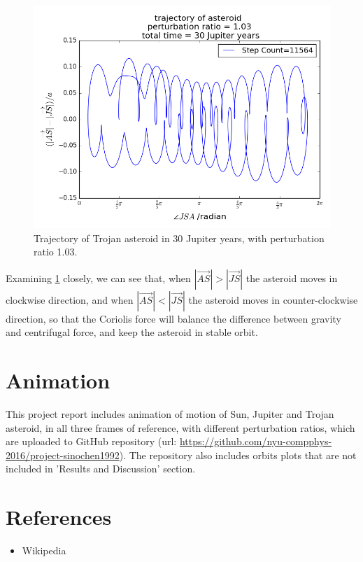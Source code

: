 \documentclass[12pt,a4paper]{article}
\begin{document}
\begin{figure}[H]
\centering
\includegraphics[width=5.5in]{figure_4_103v_30orbits.png}
\caption{Trajectory of Trojan asteroid in 30 Jupiter years, with perturbation ratio 1.03.}
\label{fig:figure_4_103v_30orbits}
\end{figure}

Examining \ref{fig:figure_4_103v_30orbits} closely, we can see that, when $|\overrightarrow{AS}| > |\overrightarrow{JS}|$ the asteroid moves in clockwise direction, and when $|\overrightarrow{AS}| < |\overrightarrow{JS}|$ the asteroid moves in counter-clockwise direction, so that the Coriolis force will balance the difference between gravity and centrifugal force, and keep the asteroid in stable orbit.


\section{Animation}
This project report includes animation of motion of Sun, Jupiter and Trojan asteroid, in all three frames of reference, with different perturbation ratios, which are uploaded to GitHub repository (url: \url{https://github.com/nyu-compphys-2016/project-sinochen1992}).  The repository also includes orbits plots that are not included in 'Results and Discussion' section.


\section{References}
\begin{itemize}
\item Wikipedia 
\end{itemize}
\end{document}
